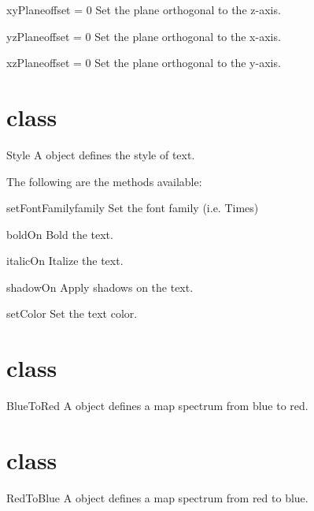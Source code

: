 \begin{methoddesc}[Transform]{xyPlane}{offset = 0}
Set the plane orthogonal to the z-axis.
\end{methoddesc}

\begin{methoddesc}[Transform]{yzPlane}{offset = 0}
Set the plane orthogonal to the x-axis.
\end{methoddesc}

\begin{methoddesc}[Transform]{xzPlane}{offset = 0}
Set the plane orthogonal to the y-axis.
\end{methoddesc}

\section{\Style class}
\begin{classdesc}{Style}{}
A \Style object defines the style of text.
\end{classdesc}

The following are the methods available:
\begin{methoddesc}[Style]{setFontFamily}{family}
Set the font family (i.e. Times)
\end{methoddesc}

\begin{methoddesc}[Style]{boldOn}{}
Bold the text.
\end{methoddesc}

\begin{methoddesc}[Style]{italicOn}{}
Italize the text.
\end{methoddesc}

\begin{methoddesc}[Style]{shadowOn}{}
Apply shadows on the text.
\end{methoddesc}

\begin{methoddesc}[Style]{setColor}{}
Set the text color.
\end{methoddesc}

\section{\BlueToRed class}
\begin{classdesc}{BlueToRed}{}
A \BlueToRed object defines a map spectrum from blue to red.
\end{classdesc}

\section{\RedToBlue class}
\begin{classdesc}{RedToBlue}{}
A \RedToBlue object defines a map spectrum from red to blue.
\end{classdesc}


